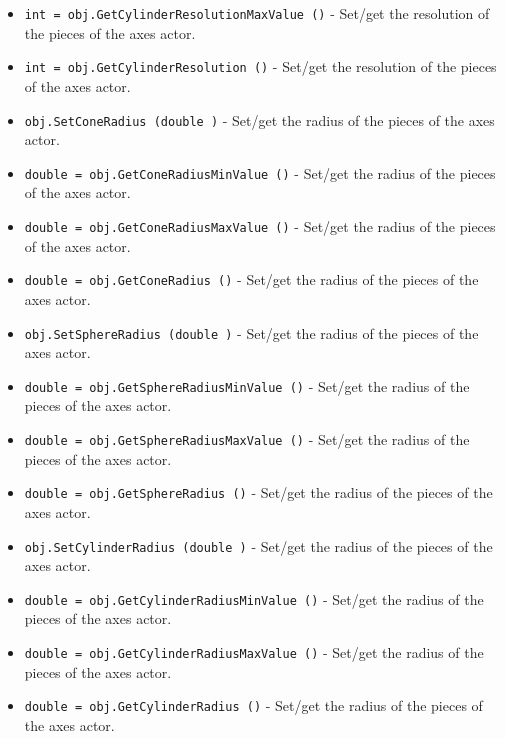 \begin{itemize}
\item  \verb|int = obj.GetCylinderResolutionMaxValue ()| -  Set/get the resolution of the pieces of the axes actor.

\item  \verb|int = obj.GetCylinderResolution ()| -  Set/get the resolution of the pieces of the axes actor.

\item  \verb|obj.SetConeRadius (double )| -  Set/get the radius of the pieces of the axes actor.

\item  \verb|double = obj.GetConeRadiusMinValue ()| -  Set/get the radius of the pieces of the axes actor.

\item  \verb|double = obj.GetConeRadiusMaxValue ()| -  Set/get the radius of the pieces of the axes actor.

\item  \verb|double = obj.GetConeRadius ()| -  Set/get the radius of the pieces of the axes actor.

\item  \verb|obj.SetSphereRadius (double )| -  Set/get the radius of the pieces of the axes actor.

\item  \verb|double = obj.GetSphereRadiusMinValue ()| -  Set/get the radius of the pieces of the axes actor.

\item  \verb|double = obj.GetSphereRadiusMaxValue ()| -  Set/get the radius of the pieces of the axes actor.

\item  \verb|double = obj.GetSphereRadius ()| -  Set/get the radius of the pieces of the axes actor.

\item  \verb|obj.SetCylinderRadius (double )| -  Set/get the radius of the pieces of the axes actor.

\item  \verb|double = obj.GetCylinderRadiusMinValue ()| -  Set/get the radius of the pieces of the axes actor.

\item  \verb|double = obj.GetCylinderRadiusMaxValue ()| -  Set/get the radius of the pieces of the axes actor.

\item  \verb|double = obj.GetCylinderRadius ()| -  Set/get the radius of the pieces of the axes actor.


\end{itemize}
